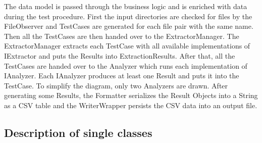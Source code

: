 The data model is passed through the business logic and is enriched with data during the test procedure. First the input directories are checked for files by the FileObserver and TestCases are generated for each file pair with the same name. Then all the TestCases are then handed over to the ExtractorManager. The ExtractorManager extracts each TestCase with all available implementations of IExtractor and puts the Results into ExtractionResults. After that, all the TestCases are handed over to the Analyzer which runs each implementation of IAnalyzer. Each IAnalyzer produces at least one Result and puts it into the TestCase. To simplify the diagram, only two Analyzers are drawn. After generating some Results, the Formatter serializes the Result Objects into a String as a CSV table and the WriterWrapper persists the CSV data into an output file.

\pagebreak
\subsection{Description of single classes}

